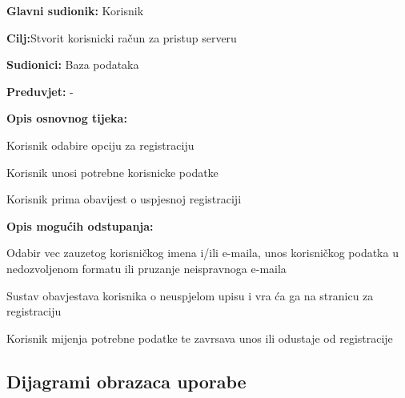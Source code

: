 \noindent {}
\begin{packed_item}
	
	\item \textbf{Glavni sudionik: } Korisnik
	\item  \textbf{Cilj:}Stvorit korisnicki račun za pristup serveru
	\item  \textbf{Sudionici:} Baza podataka
	\item  \textbf{Preduvjet:} -
	\item  \textbf{Opis osnovnog tijeka:}
	
	\item[] \begin{packed_enum}
		
		\item Korisnik odabire opciju za registraciju
		\item Korisnik unosi potrebne korisnicke podatke
		\item Korisnik prima obavijest o uspjesnoj registraciji
		
	\end{packed_enum}
	
		\item  \textbf{Opis mogućih odstupanja:}
	\item[] \begin{packed_item}
		
		\item[2.a] Odabir vec zauzetog korisničkog imena i/ili e-maila, unos korisničkog podatka u nedozvoljenom formatu ili pruzanje neispravnoga e-maila
		\item[] \begin{packed_enum}
			
			\item Sustav obavjestava korisnika o neuspjelom upisu i vra ća ga na stranicu za registraciju
			\item Korisnik mijenja potrebne podatke te zavrsava unos ili odustaje od registracije
		\end{packed_enum}
		
	\end{packed_item}
	
\end{packed_item}


\subsection{Dijagrami obrazaca uporabe}


